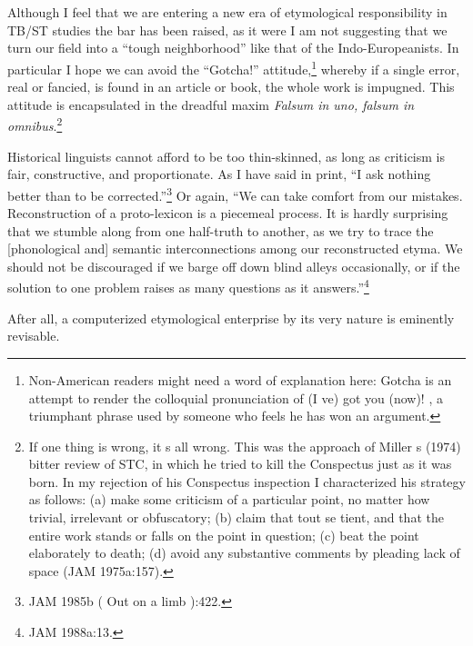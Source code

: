 \documentclass[10pt]{article}
\begin{document}
\section*{}
Although I feel that we are entering a new era of etymological responsibility in TB/ST studies  the bar has been raised, as it were  I am not suggesting that we turn our field into a ``tough neighborhood'' like that of the Indo-Europeanists. In particular I hope we can avoid the ``Gotcha!'' attitude,\footnote{Non-American readers might need a word of explanation here:  Gotcha  is an attempt to render the colloquial pronunciation of  (I ve) got you (now)! , a triumphant phrase used by someone who feels he has won an argument.} whereby if a single error, real or fancied, is found in an article or book, the whole work is impugned. This attitude is encapsulated in the dreadful maxim {\it Falsum in uno, falsum in omnibus}.\footnote{  If one thing is wrong, it s all wrong.  This was the approach of Miller s (1974) bitter review of STC, in which he tried to kill the Conspectus just as it was born. In my  rejection  of his  Conspectus inspection  I characterized his strategy as follows: (a) make some criticism of a particular point, no matter how trivial, irrelevant or obfuscatory; (b) claim that tout se tient, and that the entire work stands or falls on the point in question; (c) beat the point elaborately to death; (d) avoid any substantive comments by pleading lack of space (JAM 1975a:157).}

Historical linguists cannot afford to be too thin-skinned, as long as criticism is fair, constructive, and proportionate. As I have said in print, ``I ask nothing better than to be corrected.''\footnote{JAM 1985b ( Out on a limb ):422.} Or again, ``We can take comfort from our mistakes. Reconstruction of a proto-lexicon is a piecemeal process. It is hardly surprising that we stumble along from one half-truth to another, as we try to trace the [phonological and] semantic interconnections among our reconstructed etyma. We should not be discouraged if we barge off down blind alleys occasionally, or if the solution to one problem raises as many questions as it answers.''\footnote{JAM 1988a:13.}

After all, a computerized etymological enterprise by its very nature is eminently revisable.
\end{document}
